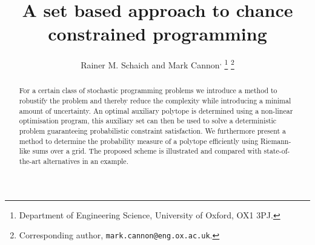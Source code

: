 \documentclass[letterpaper, 10pt, conference]{ieeeconf} %
\begin{document}
\title{A set based approach to chance constrained programming}

\author{Rainer M. Schaich\textsuperscript{\dag} %
         and Mark Cannon\textsuperscript{\dag,\ddag}%
\thanks{\textsuperscript{\dag} Department of Engineering Science, University of Oxford, OX1 3PJ.}%
\thanks{\textsuperscript{\ddag} Corresponding author, 
        \texttt{mark.cannon@eng.ox.ac.uk}.}
}
\newcommand{\note}[1]{\todo[inline]{#1}}

\maketitle

\begin{abstract} 
For a certain class of stochastic programming problems we introduce a method to robustify the problem and thereby reduce the complexity while introducing a minimal amount of uncertainty.
%
An optimal auxiliary polytope is determined using a non-linear optimisation program, this auxiliary set can then be used to solve a deterministic problem guaranteeing probabilistic constraint satisfaction.
%
We furthermore present a method to determine the probability measure of a polytope efficiently using Riemann-like sums over a grid.
%
The proposed scheme is illustrated and compared with state-of-the-art alternatives in an example.
\end{abstract}

\end{document}
